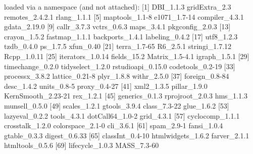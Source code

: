 \documentclass{article}
\begin{document}
\begin{Schunk}
\begin{Soutput}
loaded via a namespace (and not attached):
 [1] DBI_1.1.3          gridExtra_2.3      remotes_2.4.2.1    rlang_1.1.1       
 [5] maptools_1.1-8     e1071_1.7-14       compiler_4.3.1     gdata_2.19.0      
 [9] callr_3.7.3        vctrs_0.6.3        maps_3.4.1         pkgconfig_2.0.3   
[13] crayon_1.5.2       fastmap_1.1.1      backports_1.4.1    labeling_0.4.2    
[17] utf8_1.2.3         tzdb_0.4.0         ps_1.7.5           xfun_0.40         
[21] terra_1.7-65       R6_2.5.1           stringi_1.7.12     Rcpp_1.0.11       
[25] iterators_1.0.14   fields_15.2        Matrix_1.5-4.1     igraph_1.5.1      
[29] timechange_0.2.0   tidyselect_1.2.0   rstudioapi_0.15.0  codetools_0.2-19  
[33] processx_3.8.2     lattice_0.21-8     plyr_1.8.8         withr_2.5.0       
[37] foreign_0.8-84     desc_1.4.2         units_0.8-5        proxy_0.4-27      
[41] xml2_1.3.5         pillar_1.9.0       KernSmooth_2.23-21 rex_1.2.1         
[45] generics_0.1.3     rprojroot_2.0.3    hms_1.1.3          munsell_0.5.0     
[49] scales_1.2.1       gtools_3.9.4       class_7.3-22       glue_1.6.2        
[53] lazyeval_0.2.2     tools_4.3.1        dotCall64_1.0-2    grid_4.3.1        
[57] cyclocomp_1.1.1    crosstalk_1.2.0    colorspace_2.1-0   cli_3.6.1         
[61] spam_2.9-1         fansi_1.0.4        gtable_0.3.3       digest_0.6.33     
[65] classInt_0.4-10    htmlwidgets_1.6.2  farver_2.1.1       htmltools_0.5.6   
[69] lifecycle_1.0.3    MASS_7.3-60       
\end{Soutput}
\end{Schunk}


\printbibliography[heading=bibintoc]
\end{document}

